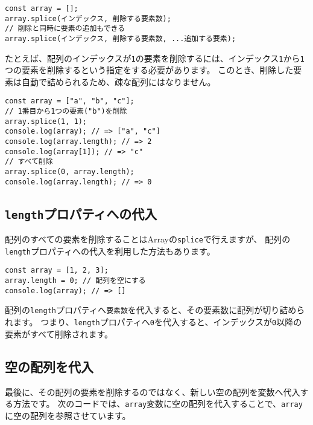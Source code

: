 \begin{lstlisting}
const array = [];
array.splice(インデックス, 削除する要素数);
// 削除と同時に要素の追加もできる
array.splice(インデックス, 削除する要素数, ...追加する要素);
\end{lstlisting}

たとえば、配列のインデックスが\texttt{1}の要素を削除するには、インデックス\texttt{1}から\texttt{1}つの要素を削除するという指定をする必要があります。
このとき、削除した要素は自動で詰められるため、疎な配列にはなりません。

\begin{lstlisting}
const array = ["a", "b", "c"];
// 1番目から1つの要素("b")を削除
array.splice(1, 1);
console.log(array); // => ["a", "c"]
console.log(array.length); // => 2
console.log(array[1]); // => "c"
// すべて削除
array.splice(0, array.length);
console.log(array.length); // => 0
\end{lstlisting}

\hypertarget{assign-to-length}{%
\subsection{\texorpdfstring{\texttt{length}プロパティへの代入}{lengthプロパティへの代入}}\label{assign-to-length}}

配列のすべての要素を削除することはArrayの\texttt{splice}で行えますが、
配列の\texttt{length}プロパティへの代入を利用した方法もあります。

\begin{lstlisting}
const array = [1, 2, 3];
array.length = 0; // 配列を空にする
console.log(array); // => []
\end{lstlisting}

配列の\texttt{length}プロパティへ\texttt{要素数}を代入すると、その要素数に配列が切り詰められます。
つまり、\texttt{length}プロパティへ\texttt{0}を代入すると、インデックスが\texttt{0}以降の要素がすべて削除されます。

\hypertarget{assign-empty-array}{%
\subsection{空の配列を代入}\label{assign-empty-array}}

最後に、その配列の要素を削除するのではなく、新しい空の配列を変数へ代入する方法です。
次のコードでは、\texttt{array}変数に空の配列を代入することで、\texttt{array}に空の配列を参照させています。

